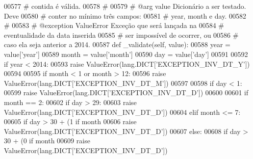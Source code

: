 \begin{DoxyCode}
00577     \textcolor{comment}{#   contida é válida.}
00578     \textcolor{comment}{#}
00579     \textcolor{comment}{#   @arg        value       Dicionário a ser testado. Deve}
00580     \textcolor{comment}{#                           conter no mínimo três campos:}
00581     \textcolor{comment}{#                           year, month e day.}
00582     \textcolor{comment}{#}
00583     \textcolor{comment}{#   @exception  ValueError  Exceção que será lançada na}
00584     \textcolor{comment}{#                           eventualidade da data inserida}
00585     \textcolor{comment}{#                           ser impossível de ocorrer, ou}
00586     \textcolor{comment}{#                           caso ela seja anterior a 2014.}
00587     \textcolor{keyword}{def }\_validate(self, value):
00588         year = value[\textcolor{stringliteral}{'year'}]
00589         month = value[\textcolor{stringliteral}{'month'}]
00590         day = value[\textcolor{stringliteral}{'day'}]
00591 
00592         \textcolor{keywordflow}{if} year < 2014:
00593             \textcolor{keywordflow}{raise} ValueError(lang.DICT[\textcolor{stringliteral}{'EXCEPTION\_INV\_DT\_Y'}])
00594 
00595         \textcolor{keywordflow}{if} month < 1 \textcolor{keywordflow}{or} month > 12:
00596             \textcolor{keywordflow}{raise} ValueError(lang.DICT[\textcolor{stringliteral}{'EXCEPTION\_INV\_DT\_M'}])
00597 
00598         \textcolor{keywordflow}{if} day < 1:
00599             \textcolor{keywordflow}{raise} ValueError(lang.DICT[\textcolor{stringliteral}{'EXCEPTION\_INV\_DT\_D'}])
00600 
00601         \textcolor{keywordflow}{if} month == 2:
00602             \textcolor{keywordflow}{if} day > 29:
00603                 \textcolor{keywordflow}{raise} ValueError(lang.DICT[\textcolor{stringliteral}{'EXCEPTION\_INV\_DT\_D'}])
00604         \textcolor{keywordflow}{elif} month <= 7:
00605             \textcolor{keywordflow}{if} day > 30 + (1 \textcolor{keywordflow}{if} month %
00606                 \textcolor{keywordflow}{raise} ValueError(lang.DICT[\textcolor{stringliteral}{'EXCEPTION\_INV\_DT\_D'}])
00607         \textcolor{keywordflow}{else}:
00608             \textcolor{keywordflow}{if} day > 30 + (0 \textcolor{keywordflow}{if} month %
00609                 \textcolor{keywordflow}{raise} ValueError(lang.DICT[\textcolor{stringliteral}{'EXCEPTION\_INV\_DT\_D'}])
\end{DoxyCode}
